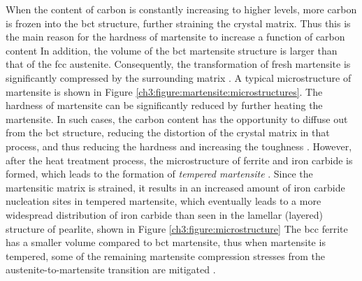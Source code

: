 \documentclass[12pt]{report}
\begin{document}
When the content of carbon is constantly increasing to higher levels, more carbon is frozen into the bct structure, further straining the crystal matrix. Thus this is the main reason for the hardness of martensite to increase a function of carbon content \cite{bajaj2020steels} In addition, the volume of the bct martensite structure is larger than that of the fcc austenite. Consequently, the transformation of fresh martensite is significantly compressed by the surrounding matrix \cite{bajaj2020steels}. A typical microstructure of martensite is shown in Figure \ref{ch3:figure:martensite:microstructures}.
The hardness of martensite can be significantly reduced by further heating the martensite. In such cases, the carbon content has the opportunity to diffuse out from the bct structure, reducing the distortion of the crystal matrix in that process, and thus reducing the hardness and increasing the toughness \cite{bhadeshia2017steels}. However, after the heat treatment process, the microstructure of ferrite and iron carbide is formed, which leads to the formation of \emph{tempered martensite} \cite{bajaj2020steels}. Since the martensitic matrix is strained, it results in an increased amount of iron carbide nucleation sites in tempered martensite, which eventually leads to a more widespread distribution of iron carbide than seen in the lamellar (layered) structure of pearlite, shown in Figure \ref{ch3:figure:microstructure} \cite{bajaj2020steels} The bcc ferrite has a smaller volume compared to bct martensite, thus when martensite is tempered, some of the remaining martensite compression stresses from the austenite-to-martensite transition are mitigated \cite{molabe2018determining}.
\end{document}
